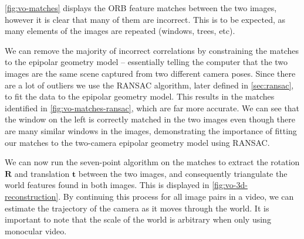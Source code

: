 \autoref{fig:vo-matches} displays the ORB feature matches between the two images, however it is clear that many of them are incorrect. This is to be expected, as many elements of the images are repeated (windows, trees, etc).

We can remove the majority of incorrect correlations by constraining the matches to the epipolar geometry model – essentially telling the computer that the two images are the same scene captured from two different camera poses. Since there are a lot of outliers we use the RANSAC algorithm, later defined in \autoref{sec:ransac}, to fit the data to the epipolar geometry model. This results in the matches identified in \autoref{fig:vo-matches-ransac}, which are far more accurate. We can see that the window on the left is correctly matched in the two images even though there are many similar windows in the images, demonstrating the importance of fitting our matches to the two-camera epipolar geometry model using RANSAC.

We can now run the seven-point algorithm \autocite{Hartley2004} on the matches to extract the rotation $\mathbf{R}$ and translation $\mathbf{t}$ between the two images, and consequently triangulate the world features found in both images. This is displayed in \autoref{fig:vo-3d-reconstruction}. By continuing this process for all image pairs in a video, we can estimate the trajectory of the camera as it moves through the world. It is important to note that the scale of the world is arbitrary when only using monocular video.

